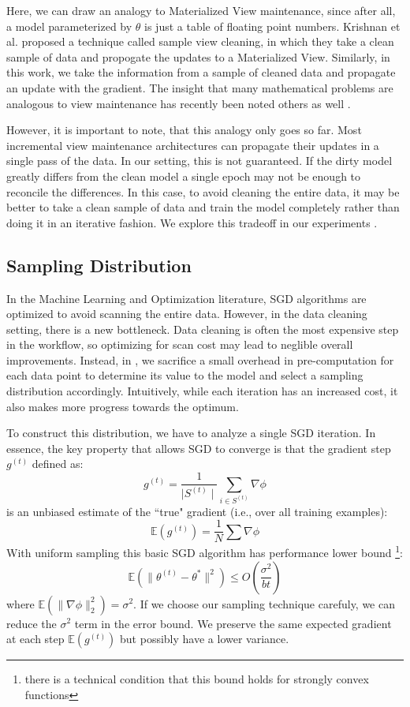 Here, we can draw an analogy to Materialized View maintenance, since after all, a model parameterized by $\theta$ is just a table of floating point numbers.
Krishnan et al. proposed a technique called sample view cleaning, in which they take a clean sample of data and propogate the updates to a Materialized View.
Similarly, in this work, we take the information from a sample of cleaned data and propagate an update with the gradient.
The insight that many mathematical problems are analogous to view maintenance has recently been noted others as well \cite{nikolic2014linview}. 

However, it is important to note, that this analogy only goes so far.
Most incremental view maintenance architectures can propagate their updates in a single pass of the data.
In our setting, this is not guaranteed. 
If the dirty model greatly differs from the clean model a single epoch may not be enough to reconcile the differences.
In this case, to avoid cleaning the entire data, it may be better to take a clean sample of data and train the model completely rather than doing it in an iterative fashion.
We explore this tradeoff in our experiments \reminder{[?]}.

\subsection{Sampling Distribution}\label{dist-samp}
In the Machine Learning and Optimization literature, SGD algorithms are optimized to avoid scanning the entire data.
However, in the data cleaning setting, there is a new bottleneck.
Data cleaning is often the most expensive step in the workflow, so optimizing for scan cost may lead to neglible overall improvements.
Instead, in \sys, we sacrifice a small overhead in pre-computation for each data point to determine its value to the model and select a sampling distribution accordingly.
Intuitively, while each iteration has an increased cost, it also makes more progress towards the optimum.

To construct this distribution, we have to analyze a single SGD iteration.
In essence, the key property that allows SGD to converge is that the gradient step $g^{(t)}$ defined as:
\[
g^{(t)} = \frac{1}{\mid S^{(t)}\mid}\sum_{i\in S^{(t)}}\nabla\phi
\]
is an unbiased estimate of the ``true" gradient (i.e., over all training examples):
\[
\mathbb{E}(g^{(t)}) = \frac{1}{N}\sum\nabla\phi
\]
With uniform sampling this basic SGD algorithm has performance lower bound \footnote{there is a technical condition that this bound holds for strongly convex functions}:
\[
\mathbb{E}(\|\theta^{(t)}-\theta^{*}\|^{2})\le O(\frac{\sigma^{2}}{bt})
\]
where $\mathbb{E}(\|\nabla\phi\|_{2}^{2})=\sigma^{2}$.
If we choose our sampling technique carefuly, we can reduce the $\sigma^{2}$ term in the error bound.
We preserve the same expected gradient at each step $\mathbb{E}(g^{(t)})$ but possibly have a lower variance.


